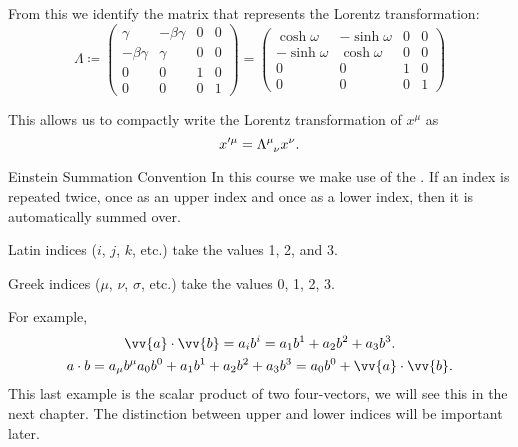 \documentclass[fleqn]{NotesClass}
\begin{document}
    From this we identify the matrix that represents the Lorentz transformation:
    \begin{equation}
        \Lambda \coloneqq
        \begin{pmatrix}
            \gamma & -\beta\gamma & 0 & 0\\
            -\beta\gamma & \gamma & 0 & 0\\
            0 & 0 & 1 & 0\\
            0 & 0 & 0 & 1
        \end{pmatrix}
        =
        \begin{pmatrix}
            \cosh\omega & -\sinh\omega & 0 & 0\\
            -\sinh\omega & \cosh\omega & 0 & 0\\
            0 & 0 & 1 & 0\\
            0 & 0 & 0 & 1
        \end{pmatrix}
    \end{equation}
    
    This allows us to compactly write the Lorentz transformation of \(x^\mu\) as
    \begin{equation}
        x'^\mu = \tensor{\Lambda}{^\mu_\nu}x^\nu.
    \end{equation}
    \begin{ntn}{Einstein Summation Convention}{}
        In this course we make use of the .
        If an index is repeated twice, once as an upper index and once as a lower index, then it is automatically summed over.
        
        Latin indices (\(i\), \(j\), \(k\), etc.) take the values 1, 2, and 3.
        
        Greek indices (\(\mu\), \(\nu\), \(\sigma\), etc.) take the values 0, 1, 2, 3.
        
        For example,
        \begin{gather}
            \vv{a} \cdot \vv{b} = a_ib^i = a_1b^1 + a_2b^2 + a_3b^3.\\
            a \cdot b = a_\mu b^\mu a_0b^0 + a_1b^1 + a_2b^2 + a_3b^3 = a_0b^0 + \vv{a}\cdot\vv{b}.
        \end{gather}
        This last example is the scalar product of two four-vectors, we will see this in the next chapter.
        The distinction between upper and lower indices will be important later.
    \end{ntn}
    
\end{document}
